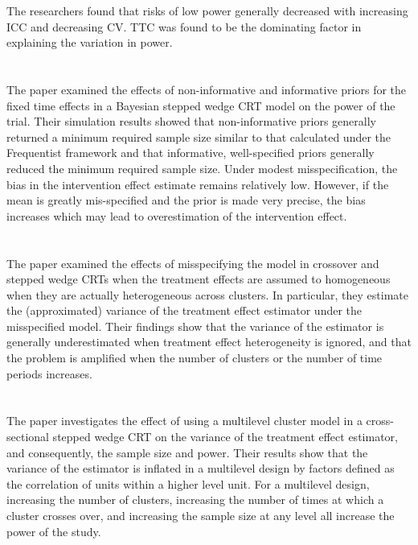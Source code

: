 \documentclass{article}
\begin{document}
The researchers found that risks of low power generally decreased with increasing ICC and decreasing CV. TTC was found to be the dominating factor in explaining the variation in power.


\newpage


\section{\textcite{Zhan:2021}}

The paper examined the effects of non-informative and informative priors for the fixed time effects in a Bayesian stepped wedge CRT model on the power of the trial. Their simulation results showed that non-informative priors generally returned a minimum required sample size similar to that calculated under the Frequentist framework and that informative, well-specified priors generally reduced the minimum required sample size. Under modest misspecification, the bias in the intervention effect estimate remains relatively low. However, if the mean is greatly mis-specified and the prior is made very precise, the bias increases which may lead to overestimation of the intervention effect.


\newpage


\section{\textcite{Bowden:2021}}

The paper examined the effects of misspecifying the model in crossover and stepped wedge CRTs when the treatment effects are assumed to homogeneous when they are actually heterogeneous across clusters. In particular, they estimate the (approximated) variance of the treatment effect estimator under the misspecified model. Their findings show that the variance of the estimator is generally underestimated when treatment effect heterogeneity is ignored, and that the problem is amplified when the number of clusters or the number of time periods increases.


\newpage


\section{\textcite{Teerenstra:2019}}

The paper investigates the effect of using a multilevel cluster model in a cross-sectional stepped wedge CRT on the variance of the treatment effect estimator, and consequently, the sample size and power. Their results show that the variance of the estimator is inflated in a multilevel design by factors defined as the correlation of units within a higher level unit. For a multilevel design, increasing the number of clusters, increasing the number of times at which a cluster crosses over, and increasing the sample size at any level all increase the power of the study.
\end{document}
